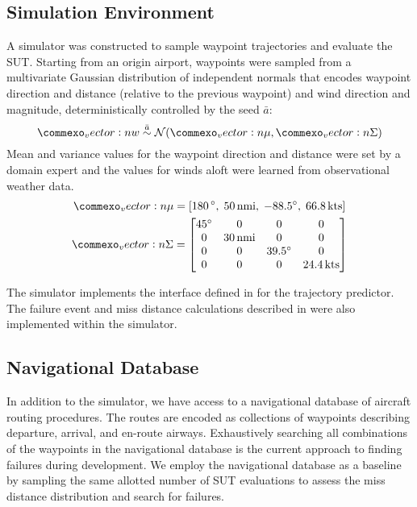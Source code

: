 \subsection{Simulation Environment}
A simulator was constructed to sample waypoint trajectories and evaluate the SUT.
Starting from an origin airport, waypoints were sampled from a multivariate Gaussian distribution of independent normals that encodes waypoint direction and distance (relative to the previous waypoint) and wind direction and magnitude, deterministically controlled by the seed $\bar{a}$:
\begin{equation}
  \vec{w} \overset{\bar{a}}{\sim} \Normal(\vec{\mu}, \vec{\Sigma})
\end{equation}
Mean and variance values for the waypoint direction and distance were set by a domain expert and the values for winds aloft were learned from observational weather data.
\begin{gather*}
\vec{\mu} = \left[180\,\si{\degree},\; 50\,\si{nmi},\; -88.5\si{\degree},\; 66.8\,\si{kts}\right]\\
\mat{\Sigma} = \begin{bmatrix}
45\si{\degree} & 0 & 0 & 0\\
0 & 30\,\si{nmi} & 0 & 0\\
0 & 0 & 39.5\si{\degree} & 0\\
0 & 0 & 0 & 24.4\,\si{kts}
\end{bmatrix}
\end{gather*}

The simulator implements the interface defined in  for the trajectory predictor.
The failure event and miss distance calculations described in  were also implemented within the simulator.

\subsection{Navigational Database}
In addition to the simulator, we have access to a navigational database of aircraft routing procedures.
The routes are encoded as collections of waypoints describing departure, arrival, and en-route airways.
Exhaustively searching all combinations of the waypoints in the navigational database is the current approach to finding failures during development.
We employ the navigational database as a baseline by sampling the same allotted number of SUT evaluations to assess the miss distance distribution and search for failures.



